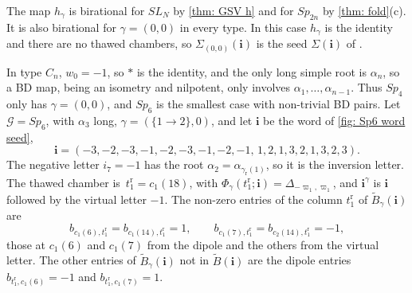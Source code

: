 \documentclass[a4paper]{amsart}
\numberwithin{equation}{section}
\theoremstyle{definition}
\theoremstyle{remark}
\newcommand{\mcG}{\mathcal{G}}
\newcommand{\bfi}{\mathbf{i}}
\newcommand{\tB}{\widetilde{B}}
\newcommand{\rr}{\mathrm{r}}
\newcommand{\Sp}{Sp_{2n}}
\begin{document}
The map $h_\gamma$ is birational for $SL_N$ by \cref{thm: GSV h} and for $\Sp$ by \cref{thm: fold}(c).
It is also birational for $\gamma=(0,0)$ in every type.
In this case $h_\gamma$ is the identity and there are no thawed chambers, so $\Sigma_{(0,0)}(\bfi)$ is the seed $\Sigma(\bfi)$ of \cite[Theorem~2.10]{BFZ05}.

\begin{example}
  \label{ex: Sp6}
  In type $C_n$, $w_0=-1$, so $*$ is the identity, and the only long simple root is $\alpha_n$, so a BD map, being an isometry and nilpotent, only involves $\alpha_1,\dots,\alpha_{n-1}$.
  Thus $Sp_4$ only has $\gamma=(0,0)$, and $Sp_6$ is the smallest case with non-trivial BD pairs.
  Let $\mcG=Sp_6$, with $\alpha_3$ long, $\gamma=(\{1\to2\},0)$, and let $\bfi$ be the word of \cref{fig: Sp6 word seed},
  \[
    \bfi=(-3,-2,-3,-1,-2,-3,-1,-2,-1,\,1,2,1,3,2,1,3,2,3).
  \]
  The negative letter $i_7=-1$ has the root $\alpha_2=\alpha_{\gamma_{\rr}(1)}$, so it is the inversion letter.
  The thawed chamber is~$t^\rr_1=c_1(18)$, with $\Phi_\gamma(t^\rr_1;\bfi)=\Delta_{-\varpi_1,\varpi_1}$, and $\bfi^\gamma$ is $\bfi$ followed by the virtual letter $-1$.
  The non-zero entries of the column $t^\rr_1$ of $\tB_\gamma(\bfi)$ are
  \[
    b_{c_1(6),t^\rr_1}=b_{c_1(14),t^\rr_1}=1,
    \qquad
    b_{c_1(7),t^\rr_1}=b_{c_2(14),t^\rr_1}=-1,
  \]
  those at $c_1(6)$ and $c_1(7)$ from the dipole and the others from the virtual letter.
  The other entries of $\tB_\gamma(\bfi)$ not in $\tB(\bfi)$ are the dipole entries $b_{t^\rr_1,c_1(6)}=-1$ and $b_{t^\rr_1,c_1(7)}=1$.


\end{example}
\end{document}
